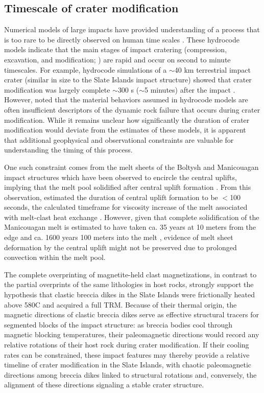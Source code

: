 \documentclass[11pt,letterpaper]{article}
\begin{document}
\subsection*{Timescale of crater modification}

Numerical models of large impacts have provided understanding of a process that is too rare to be directly observed on human time scales \citep{Pierazzo2004a}. These hydrocode models indicate that the main stages of impact cratering (compression, excavation, and modification; \cite{Gault1968a}) are rapid and occur on second to minute timescales. For example, hydrocode simulations of a $\sim$40 km terrestrial impact crater (similar in size to the Slate Islands impact structure) showed that crater modification was largely complete $\sim$300 s ($\sim$5 minutes) after the impact \citep{Collins2014a}. However, \cite{Melosh1999a} noted that the material behaviors assumed in hydrocode models are often insufficient descriptors of the dynamic rock failure that occurs during crater modification. While it remains unclear how significantly the duration of crater modification would deviate from the estimates of these models, it is apparent that additional geophysical and observational constraints are valuable for understanding the timing of this process.

One such constraint comes from the melt sheets of the Boltysh and Manicouagan impact structures which have been observed to encircle the central uplifts, implying that the melt pool solidified after central uplift formation \citep{Melosh1999a}. From this observation, \cite{Melosh1999a} estimated the duration of central uplift formation to be $<$100 seconds, the calculated timeframe for viscosity increase of the melt associated with melt-clast heat exchange \citep{Onorato1978a}. However, given that complete solidification of the Manicouagan melt is estimated to have taken ca. 35 years at 10 meters from the edge and ca. 1600 years 100 meters into the melt \citep{Onorato1978a}, evidence of melt sheet deformation by the central uplift might not be preserved due to prolonged convection within the melt pool.

The complete overprinting of magnetite-held clast magnetizations, in contrast to the partial overprints of the same lithologies in host rocks, strongly support the hypothesis that clastic breccia dikes in the Slate Islands were frictionally heated above 580\textdegree C and acquired a full TRM. Because of their thermal origin, the magnetic directions of clastic breccia dikes serve as effective structural tracers for segmented blocks of the impact structure: as breccia bodies cool through magnetic blocking temperatures, their paleomagnetic directions would record any relative rotations of their host rock during crater modification. If their cooling rates can be constrained, these impact features may thereby provide a relative timeline of crater modification in the Slate Islands, with chaotic paleomagnetic directions among breccia dikes linked to structural rotations and, conversely, the alignment of these directions signaling a stable crater structure.
\end{document}
